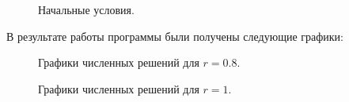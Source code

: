 \documentclass[a4paper, 14pt]{extreport}
\begin{document}
\begin{figure}[h]
\caption{Начальные условия.}
\label{ris:initial_condition}
\end{figure}

В результате работы программы были получены следующие графики:

\begin{figure}[h]
\caption{Графики численных решений для $r=0.8$.}
\label{ris:final_conditionr08}
\end{figure}

\begin{figure}[h]
\caption{Графики численных решений для $r=1$.}
\label{ris:final_conditionr1}
\end{figure}
\end{document}
